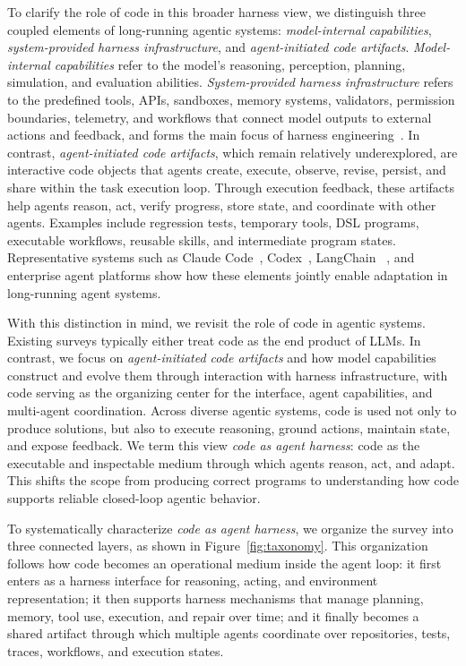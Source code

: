 To clarify the role of code in this broader harness view, we
distinguish three coupled elements of long-running agentic systems:
\emph{model-internal capabilities}, \emph{system-provided harness
infrastructure}, and \emph{agent-initiated code artifacts}.
\emph{Model-internal capabilities} refer to the model's reasoning,
perception, planning, simulation, and evaluation abilities.
\emph{System-provided harness infrastructure} refers to the
predefined tools, APIs, sandboxes, memory systems, validators,
permission boundaries, telemetry, and workflows that connect model
outputs to external actions and feedback, and forms the main focus
of harness engineering~\cite{openai2026harnessengineering,langchainanatomyharness2026}.
In contrast, \emph{agent-initiated code artifacts}, which remain
relatively underexplored, are interactive code objects that agents
create, execute, observe, revise, persist, and share within the task
execution loop. Through execution feedback, these artifacts help
agents reason, act, verify progress, store state, and coordinate
with other agents. Examples include regression tests, temporary
tools, DSL programs, executable workflows, reusable skills, and
intermediate program states. Representative systems such as Claude
Code~\cite{claudecode2025}, Codex~\cite{codex2025}, LangChain
~\cite{langchaindeepagentsharness2026}, and enterprise agent
platforms show how these elements jointly enable adaptation in long-running
agent systems.



With this distinction in mind, we revisit the role of code
in agentic systems. Existing surveys typically either treat code as the end product of
LLMs. In contrast, we focus on \emph{agent-initiated code artifacts} and
how model capabilities construct and evolve them through
interaction with harness infrastructure, with code serving as the
organizing center for the interface, agent capabilities,
and multi-agent coordination.
Across diverse agentic systems, code is used not only to produce
solutions, but also to execute reasoning, ground actions, maintain
state, and expose feedback. We term this view \emph{code as agent
harness}: code as the executable and inspectable medium through
which agents reason, act, and adapt. This shifts the scope from producing correct programs to
understanding how code supports reliable closed-loop agentic
behavior.



To systematically characterize \emph{code as agent harness}, we
organize the survey into three connected layers, as shown in
Figure~\ref{fig:taxonomy}.
This organization follows how code becomes an operational medium
inside the agent loop: it first enters as a harness interface
for reasoning, acting, and environment representation; it then
supports harness mechanisms that manage planning, memory, tool
use, execution, and repair over time; and it finally becomes a
shared artifact through which multiple agents coordinate over
repositories, tests, traces, workflows, and execution states.

